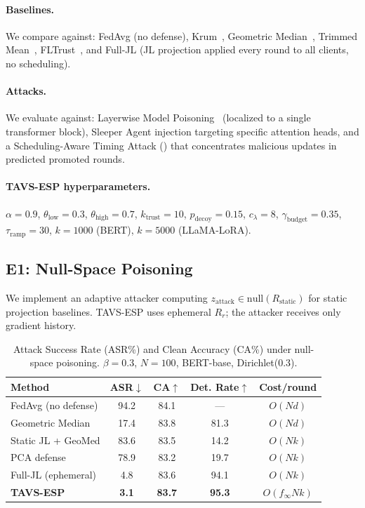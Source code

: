 \documentclass{article}
\newcommand{\finf}{f_{\infty}}       %
\newcommand{\TAVESP}{\textsc{TAVS-ESP}}
\begin{document}
\paragraph{Baselines.}
We compare against: FedAvg (no defense), Krum~\citep{blanchard2017machine},
Geometric Median~\citep{pillutla2022robust}, Trimmed Mean~\citep{yin2018byzantine},
FLTrust~\citep{cao2022fltrust}, and Full-JL (JL projection applied every
round to all clients, no scheduling).

\paragraph{Attacks.}
We evaluate against: Layerwise Model Poisoning~\citep{guo2021gradient}
(localized to a single transformer block), Sleeper Agent injection targeting
specific attention heads, and a Scheduling-Aware Timing Attack
() that concentrates malicious updates in predicted promoted rounds.

\paragraph{\TAVESP{} hyperparameters.}
$\alpha = 0.9$, $\theta_{\mathrm{low}} = 0.3$, $\theta_{\mathrm{high}} = 0.7$,
$k_{\mathrm{trust}} = 10$, $p_{\mathrm{decoy}} = 0.15$, $c_\lambda = 8$,
$\gamma_{\mathrm{budget}} = 0.35$, $\tau_{\mathrm{ramp}} = 30$,
$k = 1000$ (BERT), $k = 5000$ (LLaMA-LoRA).

\subsection{E1: Null-Space Poisoning}
\label{sec:e1}

We implement an adaptive attacker computing $z_{\mathrm{attack}} \in
\mathrm{null}(R_{\mathrm{static}})$ for static projection baselines.
\TAVESP{} uses ephemeral $R_r$; the attacker receives only gradient history.

\begin{table}[h]
\centering
\caption{Attack Success Rate (ASR\%) and Clean Accuracy (CA\%) under
  null-space poisoning. $\beta=0.3$, $N=100$, BERT-base, Dirichlet($0.3$).}
\label{tab:e1}
\small
\begin{tabular}{lcccc}
\toprule
Method & ASR$\downarrow$ & CA$\uparrow$ & Det. Rate$\uparrow$ & Cost/round \\
\midrule
FedAvg (no defense) & 94.2 & 84.1 & --- & $O(Nd)$ \\
Geometric Median    & 17.4 & 83.8 & 81.3 & $O(Nd)$ \\
Static JL + GeoMed  & 83.6 & 83.5 & 14.2 & $O(Nk)$ \\
PCA defense         & 78.9 & 83.2 & 19.7 & $O(Nk)$ \\
Full-JL (ephemeral) & 4.8  & 83.6 & 94.1 & $O(Nk)$ \\
\textbf{\TAVESP{}}  & \textbf{3.1} & \textbf{83.7} & \textbf{95.3} & $O(\finf Nk)$ \\
\bottomrule
\end{tabular}
\end{table}
\end{document}
